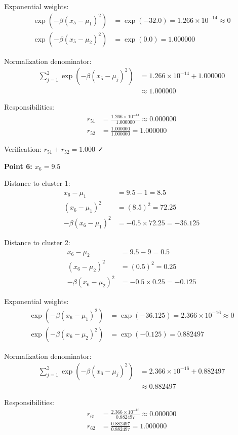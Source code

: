 \documentclass[12pt]{article}
\begin{document}
\begin{solution}
Exponential weights:
\begin{align*}
\exp(-\beta(x_5 - \mu_1)^2) &= \exp(-32.0) = 1.266 \times 10^{-14} \approx 0 \\
\exp(-\beta(x_5 - \mu_2)^2) &= \exp(0.0) = 1.000000
\end{align*}

Normalization denominator:
\begin{align*}
\sum_{j=1}^2 \exp(-\beta(x_5 - \mu_j)^2) &= 1.266 \times 10^{-14} + 1.000000 \\
&\approx 1.000000
\end{align*}

Responsibilities:
\begin{align*}
r_{51} &= \frac{1.266 \times 10^{-14}}{1.000000} \approx 0.000000 \\
r_{52} &= \frac{1.000000}{1.000000} = 1.000000
\end{align*}

Verification: $r_{51} + r_{52} = 1.000$ ✓

\textbf{Point 6: $x_6 = 9.5$}

Distance to cluster 1:
\begin{align*}
x_6 - \mu_1 &= 9.5 - 1 = 8.5 \\
(x_6 - \mu_1)^2 &= (8.5)^2 = 72.25 \\
-\beta(x_6 - \mu_1)^2 &= -0.5 \times 72.25 = -36.125
\end{align*}

Distance to cluster 2:
\begin{align*}
x_6 - \mu_2 &= 9.5 - 9 = 0.5 \\
(x_6 - \mu_2)^2 &= (0.5)^2 = 0.25 \\
-\beta(x_6 - \mu_2)^2 &= -0.5 \times 0.25 = -0.125
\end{align*}

Exponential weights:
\begin{align*}
\exp(-\beta(x_6 - \mu_1)^2) &= \exp(-36.125) = 2.366 \times 10^{-16} \approx 0 \\
\exp(-\beta(x_6 - \mu_2)^2) &= \exp(-0.125) = 0.882497
\end{align*}

Normalization denominator:
\begin{align*}
\sum_{j=1}^2 \exp(-\beta(x_6 - \mu_j)^2) &= 2.366 \times 10^{-16} + 0.882497 \\
&\approx 0.882497
\end{align*}

Responsibilities:
\begin{align*}
r_{61} &= \frac{2.366 \times 10^{-16}}{0.882497} \approx 0.000000 \\
r_{62} &= \frac{0.882497}{0.882497} = 1.000000
\end{align*}


\end{solution}
\end{document}
